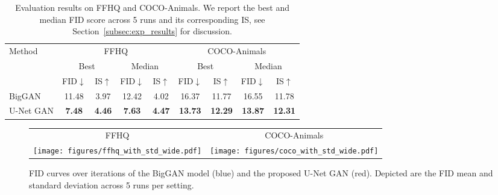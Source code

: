 \documentclass[10pt,twocolumn,letterpaper]{article}
\begin{document}
\begin{table}
	\vspace{-1em}
	\setlength{\tabcolsep}{0.0em}
	\renewcommand{\arraystretch}{1.1}
	\centering

	
\hskip -0.15in		\begin{tabular}{lcc|cc||cc|cc}
		\multirow{3}{*}{\normalsize{} Method } & \multicolumn{4}{c}{\normalsize{} FFHQ}	& \multicolumn{4}{c}{\normalsize{}{COCO-Animals}} \tabularnewline
		
		
		& \multicolumn{2}{c|}{\normalsize{} Best } & \multicolumn{2}{c||}{\normalsize{} Median }  & \multicolumn{2}{c|}{\normalsize{} Best} & \multicolumn{2}{c}{\normalsize{} Median}\tabularnewline
	\small{}   & \small{} FID$\downarrow$ & \small{} IS$\uparrow$ 	& \small{} FID$\downarrow$ & \small{} IS$\uparrow$  & \small{} FID$\downarrow$  & \small{} IS$\uparrow$  & \small{} FID$\downarrow$ & \small{} IS$\uparrow$ \tabularnewline
	
		\hline 	\hline
		\normalsize{} BigGAN \cite{Brock2019} & \normalsize{} 11.48 & \normalsize{} 3.97 & \normalsize{} 12.42 & \normalsize{} 4.02  & \normalsize{} 16.37  & \normalsize{} 11.77  & \normalsize{} 16.55  & \normalsize{} 11.78 \tabularnewline
		\normalsize{} U-Net GAN & \normalsize{} \textbf{7.48} & \normalsize{} \textbf{4.46}	& \normalsize{}  \textbf{7.63} & \normalsize{}  \textbf{4.47} &  \normalsize{} \textbf{13.73} &  \normalsize{} \textbf{12.29} & \normalsize{} \textbf{13.87}  & \normalsize{} \textbf{12.31} \tabularnewline
	\end{tabular}

	\vspace{-0.5em}
    \caption{Evaluation results on FFHQ and COCO-Animals. We report the best and median FID score across 5 runs and its corresponding IS, see Section~\ref{subsec:exp_results} for discussion.
    } \label{table:fid_overview} \vspace{-0.0em}
\end{table}
 \begin{figure}
\begin{centering}
\setlength{\tabcolsep}{0em}
\renewcommand{\arraystretch}{0}
\par\end{centering}
\begin{centering}
\vspace{-1em}
\hfill{}\begin{tabular}{@{}c@{}c@{}}
	FFHQ & COCO-Animals \\
\texttt{[image: figures/ffhq\_with\_std\_wide.pdf]}&
\texttt{[image: figures/coco\_with\_std\_wide.pdf]}
\end{tabular}\hfill{}
\par\end{centering}
\vspace{-0.5em}
\caption{\label{fig:fid_curves} FID curves over iterations of the BigGAN model (blue) and the proposed U-Net GAN (red). Depicted are the FID mean and standard deviation across 5 runs per setting.}	
\vspace{-1em}
\end{figure}
 
\end{document}
